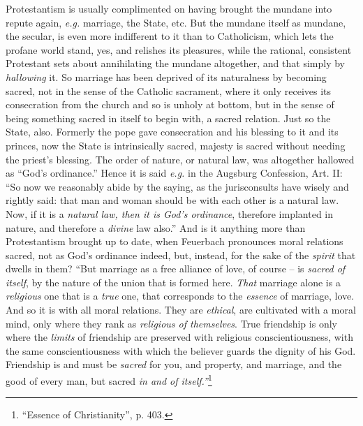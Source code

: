 \documentclass[12pt,a4paper]{book}
\begin{document}
Protestantism is usually complimented on having brought the mundane into 
repute again, \textit{e.g.} marriage, the State, etc. But the mundane itself 
as mundane, the secular, is even more indifferent to it than to Catholicism, 
which lets the profane world stand, yes, and relishes its pleasures, while the 
rational, consistent Protestant sets about annihilating the mundane 
altogether, and that simply by \textit{hallowing} it. So marriage has been 
deprived of its naturalness by becoming sacred, not in the sense of the 
Catholic sacrament, where it only receives its consecration from the church 
and so is unholy at bottom, but in the sense of being something sacred in 
itself to begin with, a sacred relation. Just so the State, also. Formerly the 
pope gave consecration and his blessing to it and its princes, now the State 
is intrinsically sacred, majesty is sacred without needing the priest's 
blessing. The order of nature, or natural law, was altogether hallowed as 
``God's ordinance.'' Hence it is said \textit{e.g.} in the Augsburg 
Confession, Art. II: ``So now we reasonably abide by the saying, as the 
jurisconsults have wisely and rightly said: that man and woman should be with 
each other is a natural law. Now, if it is a \textit{natural law, then it is 
God's ordinance}, therefore implanted in nature, and therefore a 
\textit{divine} law also.'' And is it anything more than Protestantism 
brought up to date, when Feuerbach pronounces moral relations sacred, not as 
God's ordinance indeed, but, instead, for the sake of the \textit{spirit} that 
dwells in them? ``But marriage as a free alliance of love, of course -- is 
\textit{sacred of itself}, by the nature of the union that is formed here. 
\textit{That} marriage alone is a \textit{religious} one that is a 
\textit{true} one, that corresponds to the \textit{essence} of marriage, love. 
And so it is with all moral relations. They are \textit{ethical}, are 
cultivated with a moral mind, only where they rank as \textit{religious of 
themselves}. True friendship is only where the \textit{limits} of friendship 
are preserved with religious conscientiousness, with the same 
conscientiousness with which the believer guards the dignity of his God. 
Friendship is and must be \textit{sacred} for you, and property, and marriage, 
and the good of every man, but sacred \textit{in and of 
itself.''}\footnote{``Essence of Christianity'', p. 403.}
\end{document}

